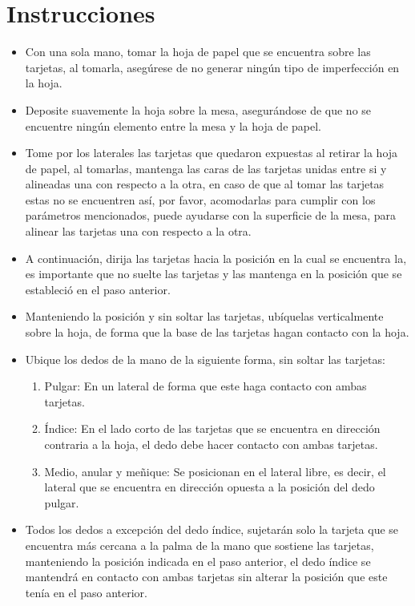 \documentclass{article}
\begin{document}
\section{Instrucciones} \label{contenido}
\begin{itemize}
    \item Con una sola mano, tomar la hoja de papel que se encuentra sobre las tarjetas, al tomarla, asegúrese de no generar ningún tipo de imperfección en la hoja.
    \item Deposite suavemente la hoja sobre la mesa, asegurándose de que no se encuentre ningún elemento entre la mesa y la hoja de papel.
    \item Tome por los laterales las tarjetas que quedaron expuestas al retirar la hoja de papel, al tomarlas, mantenga las caras de las tarjetas unidas entre si y alineadas una con respecto a la otra, en caso de que al tomar las tarjetas estas no se encuentren así, por favor, acomodarlas para cumplir con los parámetros mencionados, puede ayudarse con la superficie de la mesa, para alinear las tarjetas una con respecto a la otra.
    \item A continuación, dirija las tarjetas hacia la posición en la cual se encuentra la, es importante que no suelte las tarjetas y las mantenga en la posición que se estableció en el paso anterior.
    \item Manteniendo la posición y sin soltar las tarjetas, ubíquelas verticalmente sobre la hoja, de forma que la base de las tarjetas hagan contacto con la hoja.
    \item Ubique los dedos de la mano de la siguiente forma, sin soltar las tarjetas:
    \begin{enumerate}
        \item Pulgar: En un lateral de forma que este haga contacto con ambas tarjetas.
        \item Índice: En el lado corto de las tarjetas que se encuentra en dirección contraria a la hoja, el dedo debe hacer contacto con ambas tarjetas.
        \item Medio, anular y meñique: Se posicionan en el lateral libre, es decir, el lateral que se encuentra en dirección opuesta a la posición del dedo pulgar.
    \end{enumerate}
    \item Todos los dedos a excepción del dedo índice, sujetarán solo la tarjeta que se encuentra más cercana a la palma de la mano que sostiene las tarjetas, manteniendo la posición indicada en el paso anterior, el dedo índice se mantendrá en contacto con ambas tarjetas sin alterar la posición que este tenía en el paso anterior.

\end{itemize}
\end{document}
